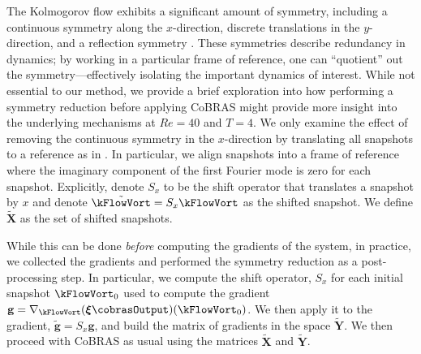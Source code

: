 \documentclass[twocolumn,10pt]{article}
\begin{document}
The Kolmogorov flow exhibits a significant amount of symmetry, including a continuous symmetry along the $x$-direction, discrete translations in the $y$-direction, and a reflection symmetry \cite{platt1991a, chandler2013invariant}. These symmetries describe redundancy in dynamics; by working in a particular frame of reference, one can ``quotient'' out the symmetry---effectively isolating the important dynamics of interest. While not essential to our method, we provide a brief exploration into how performing a symmetry reduction before applying CoBRAS might provide more insight into the underlying mechanisms at $Re=40$ and $T=4$. We only examine the effect of removing the continuous symmetry in the $x$-direction by translating all snapshots to a reference as in \cite{holmes2012turbulence}. In particular, we align snapshots into a frame of reference where the imaginary component of the first Fourier mode is zero for each snapshot. Explicitly, denote $S_x$ to be the shift operator that translates a snapshot by $x$ and denote $\tilde \kFlowVort = S_x \kFlowVort$ as the shifted snapshot. We define $\tilde{\mathbf X}$ as the set of shifted snapshots. 

While this can be done \textit{before} computing the gradients of the system, in practice, we collected the gradients and performed the symmetry reduction as a post-processing step. In particular, we compute the shift operator, $S_x$ for each initial snapshot $\kFlowVort_0$ used to compute the gradient $\mathbf g = \nabla_{\kFlowVort} (\boldsymbol{\xi}\cobrasOutput) (\kFlowVort_0)$. We then apply it to the gradient, $\tilde{\mathbf{g}} = S_x \mathbf g$, and build the matrix of gradients in the space $\tilde{\mathbf Y}$. We then proceed with CoBRAS as usual using the matrices $\tilde{\mathbf X}$ and $\tilde{\mathbf Y}$.
\end{document}
